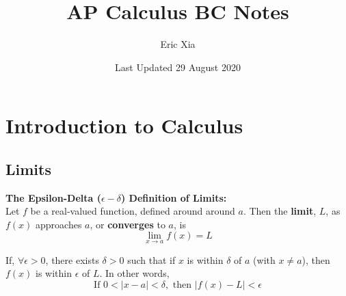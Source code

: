 \documentclass{article}
\title{AP Calculus BC Notes}
\author{Eric Xia}
\date{Last Updated 29 August 2020}
\begin{document}
    \maketitle
    \tableofcontents
    \pagebreak


    \section{Introduction to Calculus}

        \subsection{Limits}
            \color{purple} \textbf{The Epsilon-Delta ($\epsilon-\delta$) Definition of Limits:}
            \color{black} \\

            \noindent Let $f$ be a real-valued function, defined around around $a$.
            Then the \textbf{limit}, $L$, as $f(x)$ approaches $a$, or \textbf{converges} to $a$, is \\

            \begin{equation*}
                \lim_{x \to a} f(x) = L
            \end{equation*}

            \noindent If, $\forall \epsilon > 0$, there exists $\delta > 0$ such that if $x$ is
            within $\delta$ of $a$ (with $x\not = a$), then $f(x)$ is within $\epsilon$ of $L$.
            In other words, \\

            \begin{equation*}
                \text{If } 0 < |x-a| < \delta, \text{ then } |f(x)-L| < \epsilon
            \end{equation*}
\end{document}
